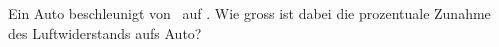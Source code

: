 Ein Auto beschleunigt von \vEiO\ auf \vZwO. Wie gross ist dabei die prozentuale Zunahme des Luftwiderstands aufs Auto?
